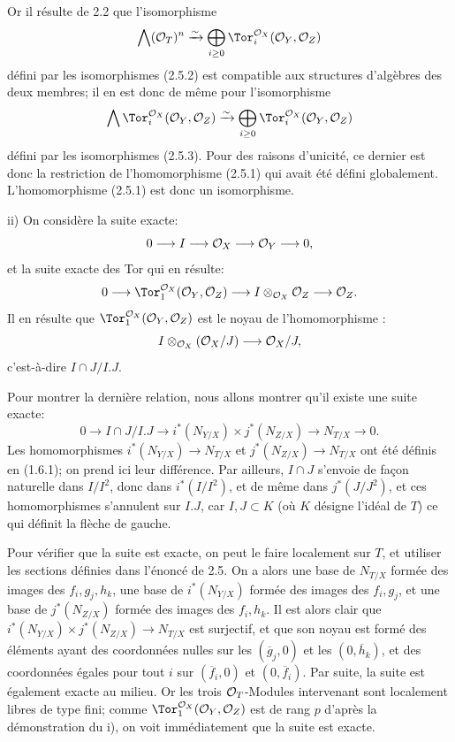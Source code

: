 Or il
résulte de 2.2 que l'isomorphisme
\[
\bigwedge(\cO_T)^n\xrightarrow{\sim}
\bigoplus_{i\ge0}\Tor_i^{\cO_X}(\cO_Y,\cO_Z)
\]
défini par les isomorphismes (2.5.2) est compatible aux structures d'algèbres des deux membres; il en est donc de même pour l'isomorphisme
\[
\bigwedge\Tor_i^{\cO_X}(\cO_Y,\cO_Z)\xrightarrow{\sim}
\bigoplus_{i\ge0}\Tor_i^{\cO_X}(\cO_Y,\cO_Z)
\]
défini par les isomorphismes (2.5.3). Pour des raisons d'unicité, ce dernier est donc la restriction de l'homomorphisme (2.5.1) qui avait été défini globalement. L'homomorphisme (2.5.1) est donc un isomorphisme.

ii) On considère la suite exacte:
\[
0\longrightarrow I\longrightarrow \mathcal O_X\longrightarrow \mathcal O_Y\longrightarrow0,
\]
et la suite exacte des Tor qui en résulte:
\[
0\longrightarrow\Tor_1^{\cO_X}(\cO_Y,\cO_Z)
\longrightarrow I\otimes_{\cO_X}\cO_Z
\longrightarrow \cO_Z.
\]
Il en résulte que \(\Tor_1^{\cO_X}(\cO_Y,\cO_Z)\) est le noyau de l'homomorphisme :
\[
I\otimes_{\mathcal O_X}(\mathcal O_X/J)\longrightarrow \mathcal O_X/J,
\]
c'est-à-dire \(I\cap J/I.J\).

Pour montrer la dernière relation, nous allons montrer qu'il existe une suite exacte:
\[
0\longrightarrow I\cap J/I.J
\longrightarrow i^*(N_{Y/X})\times j^*(N_{Z/X})
\longrightarrow N_{T/X}\longrightarrow0.
\]
Les homomorphismes \(i^*(N_{Y/X})\to N_{T/X}\) et \(j^*(N_{Z/X})\to N_{T/X}\) ont été définis en (1.6.1); on prend ici leur différence. Par ailleurs, \(I\cap J\) s'envoie de façon naturelle dans \(I/I^2\), donc dans \(i^*(I/I^2)\), et de même dans \(j^*(J/J^2)\), et ces homomorphismes s'annulent sur \(I.J\), car \(I,J\subset K\) (où \(K\) désigne l'idéal de \(T\)) ce qui définit la flèche de gauche.

Pour vérifier que la suite est exacte, on peut le faire localement sur \(T\), et utiliser les sections définies dans l'énoncé de 2.5. On a alors une base de \(N_{T/X}\) formée des images des \(f_i,g_j,h_k\), une base de \(i^*(N_{Y/X})\) formée des images des \(f_i,g_j\), et une base de \(j^*(N_{Z/X})\) formée des images des \(f_i,h_k\). Il est alors clair que \(i^*(N_{Y/X})\times j^*(N_{Z/X})\to N_{T/X}\) est surjectif, et que son noyau est formé des éléments ayant des coordonnées nulles sur les \((\overline g_j,0)\) et les \((0,\overline h_k)\), et des coordonnées égales pour tout \(i\) sur \((\overline f_i,0)\) et \((0,\overline f_i)\). Par suite, la suite est également exacte au milieu. Or les trois \(\mathcal O_T\)-Modules intervenant sont localement libres de type fini; comme \(\Tor_1^{\cO_X}(\cO_Y,\cO_Z)\) est de rang \(p\) d'après la démonstration du i), on voit immédiatement que la suite est exacte.

